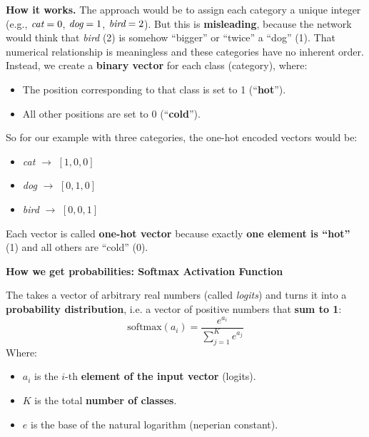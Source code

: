 \highspace
\textcolor{Green3}{ \textbf{How it works.}} The \naive approach would be to assign each category a unique integer (e.g., $\emph{cat} = 0$, $\emph{dog} = 1$, $\emph{bird} = 2$). But this is \textbf{misleading}, because the network would think that \emph{bird} (2) is somehow ``bigger'' or ``twice'' a ``dog'' (1). That numerical relationship is meaningless and these categories have no inherent order. Instead, we create a \textbf{binary vector} for each class (category), where:
\begin{itemize}
    \item The position corresponding to that class is set to 1 (``\textbf{hot}'').
    \item All other positions are set to 0 (``\textbf{cold}'').
\end{itemize}
So for our example with three categories, the one-hot encoded vectors would be:
\begin{multicols}{3}
    \begin{itemize}
        \item \emph{cat} $\rightarrow$ $\left[1, 0, 0\right]$
        \item \emph{dog} $\rightarrow$ $\left[0, 1, 0\right]$
        \item \emph{bird} $\rightarrow$ $\left[0, 0, 1\right]$
    \end{itemize}
\end{multicols}

\noindent
Each vector is called \textbf{one-hot vector} because exactly \textbf{one element is ``hot''} (1) and all others are ``cold'' (0).

\highspace
\begin{flushleft}
    \textcolor{Green3}{ \textbf{How we get probabilities: Softmax Activation Function}}
\end{flushleft}
The  takes a vector of arbitrary real numbers (called \emph{logits}) and turns it into a \textbf{probability distribution}, i.e. a vector of positive numbers that \textbf{sum to 1}:
\begin{equation}
    \text{softmax}(a_{i}) = \dfrac{e^{a_{i}}}{\displaystyle \sum_{j=1}^{K} e^{a_{j}}}
\end{equation}
Where:
\begin{itemize}
    \item $a_{i}$ is the $i$-th \textbf{element of the input vector} (logits).
    \item $K$ is the total \textbf{number of classes}.
    \item $e$ is the base of the natural logarithm (neperian constant).
\end{itemize}

